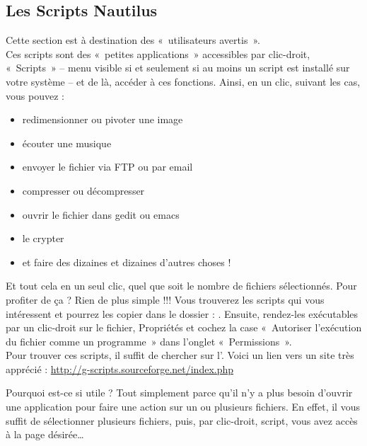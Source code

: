 \subsection{Les Scripts Nautilus}
Cette section est à destination des «~utilisateurs avertis~».\\
Ces scripts sont des «~petites applications~» accessibles par clic-droit, «~Scripts~» -- menu visible si et seulement si au moins un script est installé sur votre système -- et de là, accéder à ces fonctions. Ainsi, en un clic, suivant les cas, vous pouvez :\par
\begin{itemize}
\item redimensionner ou pivoter une image 
\item écouter une musique 
\item envoyer le fichier via FTP ou par email 
\item compresser ou décompresser 
\item ouvrir le fichier dans gedit ou emacs 
\item le crypter 
\item et faire des dizaines et dizaines d'autres choses ! 
\end{itemize}
Et tout cela en un seul clic, quel que soit le nombre de fichiers sélectionnés. Pour profiter de ça ? Rien de plus simple !!! Vous trouverez les scripts qui vous intéressent et pourrez les copier dans le dossier : . Ensuite, rendez-les exécutables par un clic-droit sur le fichier, Propriétés et cochez la case «~Autoriser l'exécution du fichier comme un programme~» dans l'onglet «~Permissions~».\\
Pour trouver ces scripts, il suffit de chercher sur l'. Voici un lien vers un site  très apprécié : \url{http://g-scripts.sourceforge.net/index.php}\par
Pourquoi est-ce si utile ? Tout simplement parce qu'il n'y a plus besoin d'ouvrir une application pour faire une action sur un ou plusieurs fichiers. En effet, il vous suffit de sélectionner plusieurs fichiers, puis, par clic-droit, script, vous avez accès à la page désirée\ldots{}
